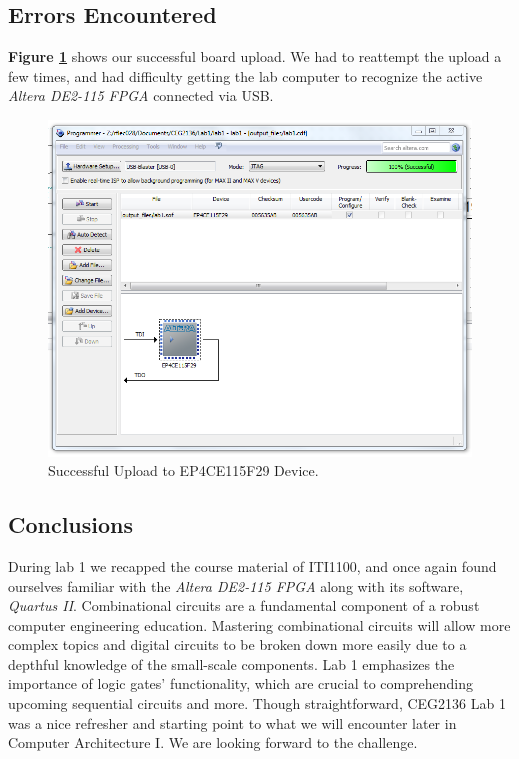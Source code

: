 \documentclass[a4paper,12pt]{article}
\begin{document}
\subsection{Errors Encountered}
\textbf{Figure \ref{fig:Uploaded}} shows our successful board upload. We had to reattempt the upload a few times, and had difficulty getting the lab computer to recognize the active \textit{Altera DE2-115 FPGA} connected via USB.
\begin{figure}[H]
\includegraphics[width=\textwidth]{Images/Upload.PNG} 
\caption{Successful Upload to EP4CE115F29 Device.}
\label{fig:Uploaded}
\end{figure}


\subsection{Conclusions}
During lab 1 we recapped the course material of ITI1100, and once again found ourselves familiar with the \textit{Altera DE2-115 FPGA} along with its software, \textit{Quartus II}. Combinational circuits are a fundamental component of a robust computer engineering education. Mastering combinational circuits will allow more complex topics and digital circuits to be broken down more easily due to a depthful knowledge of the small-scale components. Lab 1 emphasizes the importance of logic gates' functionality, which are crucial to comprehending upcoming sequential circuits and more. Though straightforward, CEG2136 Lab 1 was a nice refresher and starting point to what we will encounter later in Computer Architecture I. We are looking forward to the challenge.
\end{document}

